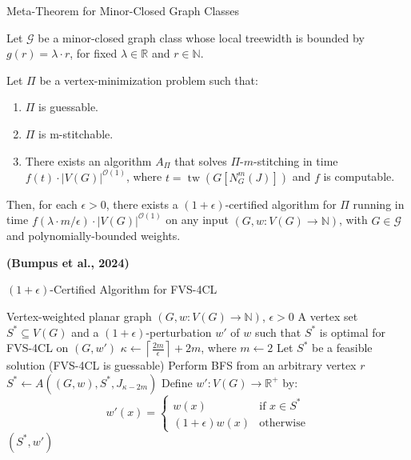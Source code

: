 \documentclass{beamer}
\newcommand{\tw}{\operatorname{tw}}
\begin{document}
\begin{frame}{Meta-Theorem for Minor-Closed Graph Classes}

\begin{theorem}
Let $\mathcal{G}$ be a minor-closed graph class whose local treewidth is bounded by $g(r) = \lambda \cdot r$, for fixed $\lambda \in \mathbb{R}$ and $r \in \mathbb{N}$.

Let $\Pi$ be a vertex-minimization problem such that:
\begin{enumerate}
    \item $\Pi$ is guessable.
    \item $\Pi$ is m-stitchable.
    \item There exists an algorithm $A_\Pi$ that solves $\Pi$-$m$-stitching in time 
    $f(t) \cdot |V(G)|^{\mathcal{O}(1)}$, where $t = \tw(G[N_G^m(J)])$ and $f$ is computable.
\end{enumerate}

Then, for each $\epsilon > 0$, there exists a $(1 + \epsilon)$-certified algorithm for $\Pi$ 
running in time $f(\lambda \cdot m / \epsilon) \cdot |V(G)|^{\mathcal{O}(1)}$ on any input 
$(G, w : V(G) \to \mathbb{N})$, with $G \in \mathcal{G}$ and polynomially-bounded weights.
\end{theorem}

\hfill {\small \textbf{(Bumpus et al., 2024)}}

\end{frame}

\begin{frame}[fragile]{{$(1+\epsilon)$}-Certified Algorithm for FVS-4CL}
  \begin{algorithm}[H]
    \caption{$(1+\epsilon)$-Certified algorithm for FVS-4CL}
    \begin{algorithmic}[1]
    \REQUIRE Vertex-weighted planar graph $(G, w:V(G) \to \mathbb{N})$, $\epsilon > 0$
    \ENSURE A vertex set $S^* \subseteq V(G)$ and a $(1+\epsilon)$-perturbation $w'$ of $w$ such that $S^*$ is optimal for FVS-4CL on $(G, w')$
    \STATE $\kappa \leftarrow \left\lceil \frac{2m}{\epsilon} \right\rceil + 2m$, where $m \leftarrow 2$
    \STATE Let $S^*$ be a feasible solution (FVS-4CL is guessable)
    \STATE Perform BFS from an arbitrary vertex $r$
        \STATE $S^* \leftarrow A((G,w), S^*, J_{\kappa-2m})$
    \ENDWHILE
    \STATE Define $w': V(G) \rightarrow \mathbb{R}^+$ by:
    \[
    w'(x) = 
    \begin{cases}
    w(x) & \text{if } x \in S^* \\
    (1 + \epsilon)w(x) & \text{otherwise}
    \end{cases}
    \]
    \RETURN $(S^*, w')$
    \end{algorithmic}
  \end{algorithm}
\end{frame}
\end{document}
